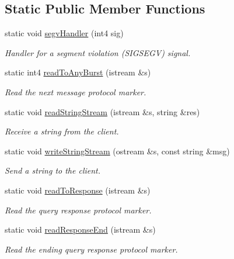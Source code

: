 \subsection*{Static Public Member Functions}
\begin{DoxyCompactItemize}
\item 
static void \mbox{\hyperlink{class_architecture_ghidra_a606fbae6a63c41723343137c56f84eca}{segv\+Handler}} (int4 sig)
\begin{DoxyCompactList}\small\item\em Handler for a segment violation (S\+I\+G\+S\+E\+GV) signal. \end{DoxyCompactList}\item 
static int4 \mbox{\hyperlink{class_architecture_ghidra_a3132c5fe1bb675952197aa4eafcf298e}{read\+To\+Any\+Burst}} (istream \&s)
\begin{DoxyCompactList}\small\item\em Read the next message protocol marker. \end{DoxyCompactList}\item 
static void \mbox{\hyperlink{class_architecture_ghidra_a80e284d7f210bb4f528607a5a62de7ec}{read\+String\+Stream}} (istream \&s, string \&res)
\begin{DoxyCompactList}\small\item\em Receive a string from the client. \end{DoxyCompactList}\item 
static void \mbox{\hyperlink{class_architecture_ghidra_a438f8405f19893ac1aa3057f67188f4a}{write\+String\+Stream}} (ostream \&s, const string \&msg)
\begin{DoxyCompactList}\small\item\em Send a string to the client. \end{DoxyCompactList}\item 
static void \mbox{\hyperlink{class_architecture_ghidra_a3b18a5a9e669ac8adabe9da47d2aaddf}{read\+To\+Response}} (istream \&s)
\begin{DoxyCompactList}\small\item\em Read the query response protocol marker. \end{DoxyCompactList}\item 
static void \mbox{\hyperlink{class_architecture_ghidra_a948fffd4d8e181563ade259d97074419}{read\+Response\+End}} (istream \&s)
\begin{DoxyCompactList}\small\item\em Read the ending query response protocol marker. \end{DoxyCompactList}\item 

\end{DoxyCompactItemize}
